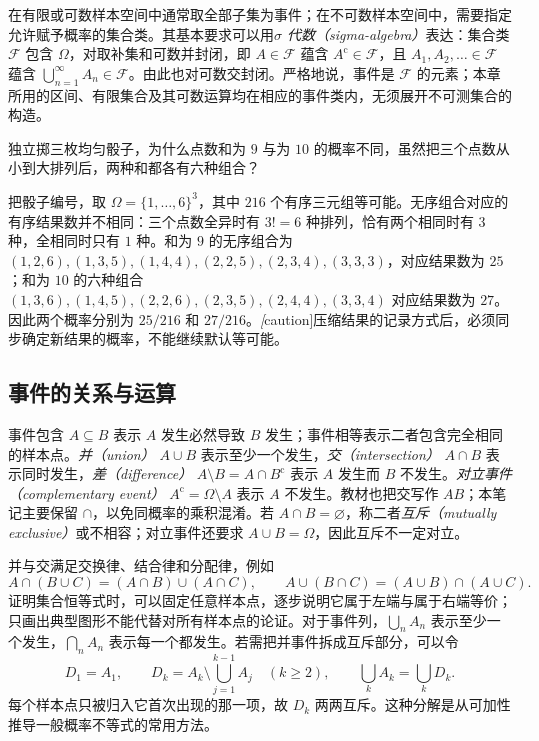 在有限或可数样本空间中通常取全部子集为事件；在不可数样本空间中，需要指定允许赋予概率的集合类。其基本要求可以用\emph{$\sigma$ 代数（sigma-algebra）}表达：集合类 $\mathcal F$ 包含 $\Omega$，对取补集和可数并封闭，即 $A\in\mathcal F$ 蕴含 $A^{\mathrm c}\in\mathcal F$，且 $A_1,A_2,\ldots\in\mathcal F$ 蕴含 $\bigcup_{n=1}^{\infty}A_n\in\mathcal F$。由此也对可数交封闭。严格地说，事件是 $\mathcal F$ 的元素；本章所用的区间、有限集合及其可数运算均在相应的事件类内，无须展开不可测集合的构造。

\begin{example}
\label{ex:study-three-dice-space}
独立掷三枚均匀骰子，为什么点数和为 $9$ 与为 $10$ 的概率不同，虽然把三个点数从小到大排列后，两种和都各有六种组合？
\end{example}

\begin{solve}
把骰子编号，取 $\Omega=\{1,\ldots,6\}^{3}$，其中 $216$ 个有序三元组等可能。无序组合对应的有序结果数并不相同：三个点数全异时有 $3!=6$ 种排列，恰有两个相同时有 $3$ 种，全相同时只有 $1$ 种。和为 $9$ 的无序组合为 $(1,2,6),(1,3,5),(1,4,4),(2,2,5),(2,3,4),(3,3,3)$，对应结果数为 $25$；和为 $10$ 的六种组合 $(1,3,6),(1,4,5),(2,2,6),(2,3,5),(2,4,4),(3,3,4)$ 对应结果数为 $27$。因此两个概率分别为 $25/216$ 和 $27/216$。\emph[caution]{压缩结果的记录方式后，必须同步确定新结果的概率，不能继续默认等可能。}
\end{solve}

\subsection{事件的关系与运算}
\label{subsec:study-event-operations}

事件包含 $A\subseteq B$ 表示 $A$ 发生必然导致 $B$ 发生；事件相等表示二者包含完全相同的样本点。\emph{并（union）} $A\cup B$ 表示至少一个发生，\emph{交（intersection）} $A\cap B$ 表示同时发生，\emph{差（difference）} $A\setminus B=A\cap B^{\mathrm c}$ 表示 $A$ 发生而 $B$ 不发生。\emph{对立事件（complementary event）} $A^{\mathrm c}=\Omega\setminus A$ 表示 $A$ 不发生。教材也把交写作 $AB$；本笔记主要保留 $\cap$，以免同概率的乘积混淆。若 $A\cap B=\varnothing$，称二者\emph{互斥（mutually exclusive）}或不相容；对立事件还要求 $A\cup B=\Omega$，因此互斥不一定对立。

并与交满足交换律、结合律和分配律，例如
\[
 A\cap(B\cup C)=(A\cap B)\cup(A\cap C),\qquad
 A\cup(B\cap C)=(A\cup B)\cap(A\cup C).
\]
证明集合恒等式时，可以固定任意样本点，逐步说明它属于左端与属于右端等价；只画出典型图形不能代替对所有样本点的论证。对于事件列，$\bigcup_n A_n$ 表示至少一个发生，$\bigcap_n A_n$ 表示每一个都发生。若需把并事件拆成互斥部分，可以令
\begin{equation}
 D_1=A_1,\qquad D_k=A_k\setminus\bigcup_{j=1}^{k-1}A_j\quad(k\ge2),
 \qquad \bigcup_k A_k=\bigcup_k D_k.
 \label{eq:study-disjointization}
\end{equation}
每个样本点只被归入它首次出现的那一项，故 $D_k$ 两两互斥。这种分解是从可加性推导一般概率不等式的常用方法。

